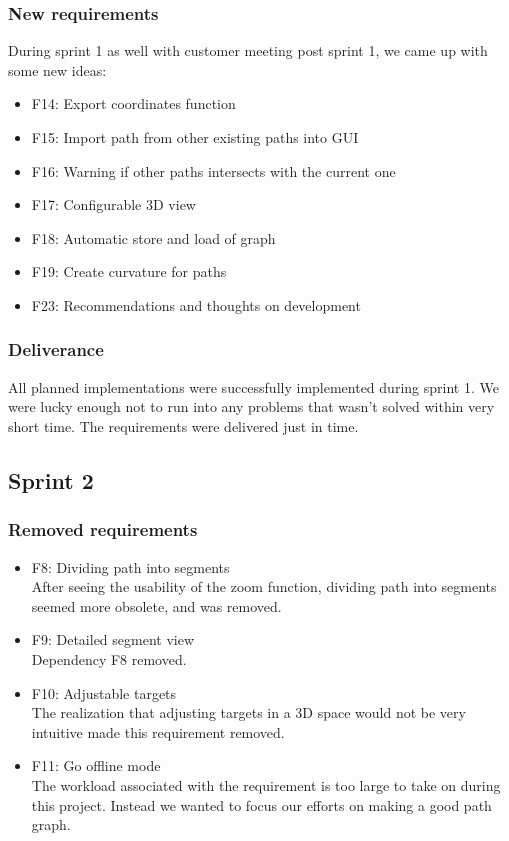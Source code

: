 \documentclass{report}
\begin{document}
\subsubsection{New requirements}
During sprint 1 as well with customer meeting post sprint 1,  we came up with some new ideas:
\begin{itemize}
    \item F14: Export coordinates function
    \item F15: Import path from other existing paths into GUI
    \item F16: Warning if other paths intersects with the current one
    \item F17: Configurable 3D view
    \item F18: Automatic store and load of graph
    \item F19: Create curvature for paths
    \item F23: Recommendations and thoughts on development
\end{itemize}

\subsubsection{Deliverance}
All planned implementations were successfully implemented during sprint 1. We were lucky enough not to run into any problems that wasn't solved within very short time. The requirements were delivered just in time.

\subsection{Sprint 2} \label{sec:sprint2_requirementsevolution}

\subsubsection{Removed requirements}
\begin{itemize}
    \item F8: Dividing path into segments \\
    After seeing the usability of the zoom function, dividing path into segments seemed more obsolete, and was removed.
    \item F9: Detailed segment view \\
    Dependency F8 removed.
    \item F10: Adjustable targets \\
    The realization that adjusting targets in a 3D space would not be very intuitive made this requirement removed.
    \item F11: Go offline mode \\
    The workload associated with the requirement is too large to take on during this project. Instead we wanted to focus our efforts on making a good path graph.
\end{itemize}
\end{document}
